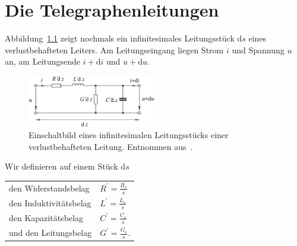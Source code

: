 \documentclass[paper=a4, parskip=half-, ngerman, fontsize=11pt]{scrreprt}
\begin{document}
\chapter{Die Telegraphenleitungen}
Abbildung~\ref{Leitung4} zeigt nochmals ein infinitesimales Leitungsstück $\mathrm{d}s$ eines verlustbehafteten
Leiters. Am Leitungseingang liegen Strom $i$ und Spannung $u$ an, am Leitungsende $i + \mathrm{d}i$ und $u +
\mathrm{d}u$.
\begin{figure}[!h]
    \begin{center}
        \includegraphics[width=0.5\textwidth]{images/Leitungsstueck2.png}
        \caption{Einschaltbild eines infinitesimalen Leitungsstücks einer verlustbehafteten Leitung. Entnommen
        aus~\cite{LeitungenUndFilter}.}
        \label{Leitung4}
    \end{center}
\end{figure}

Wir definieren auf einem Stück $\mathrm{d}s$

\begin{tabular}{l l}
    den Widerstandsbelag & $R^{\prime} = \frac{R_{s}}{s}$ \\
\addlinespace
    den Induktivitätsbelag & $L^{\prime} = \frac{L_{s}}{s}$ \\
\addlinespace
    den Kapazitätsbelag & $C^{\prime} = \frac{C_{s}}{s}$ \\
\addlinespace
    und den Leitungsbelag & $G^{\prime} = \frac{G_{s}}{s}$. \\
\end{tabular}
\end{document}
